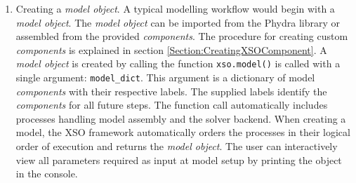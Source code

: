 \documentclass[journal abbreviation, manuscript]{copernicus}
\begin{document}
\begin{enumerate}
    \item  Creating a \textit{model object}. 
    A typical modelling workflow would begin with a \textit{model object}. The \textit{model object} can be imported from the Phydra library or assembled from the provided \textit{components}. The procedure for creating custom \textit{components} is explained in section \ref{Section:CreatingXSOComponent}. A \textit{model object} is created by calling the function \texttt{xso.model()} is called with a single argument: \texttt{model\_dict}. This argument is a dictionary of model \textit{components} with their respective labels. The supplied labels identify the \textit{components} for all future steps. The function call automatically includes processes handling model assembly and the solver backend. When creating a model, the XSO framework automatically orders the processes in their logical order of execution and returns the \textit{model object}. The user can interactively view all parameters required as input at model setup by printing the object in the console.


\end{enumerate}
\end{document}
